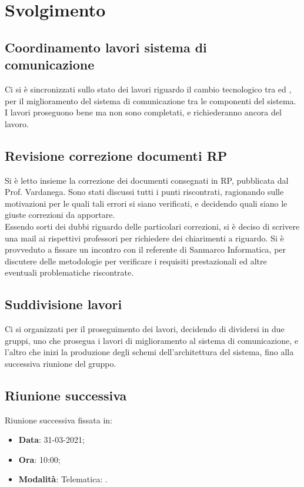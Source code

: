 \documentclass[]{article}
\begin{document}
	\newpage

	\section{Svolgimento}
		\subsection{Coordinamento lavori sistema di comunicazione}
		Ci si è sincronizzati sullo stato dei lavori riguardo il cambio tecnologico tra  ed , per il miglioramento del sistema di comunicazione tra le componenti del sistema. \\
		I lavori proseguono bene ma non sono completati, e richiederanno ancora del lavoro.
		\\
		
		\subsection{Revisione correzione documenti RP}
		Si è letto insieme la correzione dei documenti consegnati in RP, pubblicata dal Prof. Vardanega. Sono stati discussi tutti i punti riscontrati, ragionando sulle motivazioni per le quali tali errori si siano verificati, e decidendo quali siano le giuste correzioni da apportare. \\
		Essendo sorti dei dubbi riguardo delle particolari correzioni, si è deciso di scrivere una mail ai rispettivi professori per richiedere dei chiarimenti a riguardo.
		Si è provveduto a fissare un incontro con il referente di Sanmarco Informatica, per discutere delle metodologie per verificare i requisiti prestazionali ed altre eventuali problematiche riscontrate.
		\\
		
		\subsection{Suddivisione lavori}
		Ci si organizzati per il proseguimento dei lavori, decidendo di dividersi in due gruppi, uno che prosegua i lavori di miglioramento al sistema di comunicazione, e l'altro che inizi la produzione degli schemi dell'architettura del sistema, fino alla successiva riunione del gruppo.
		\\


	\subsection{Riunione successiva}
	Riunione successiva fissata in:
	\begin{itemize}
		\item \textbf{Data}: 31-03-2021;
		\item \textbf{Ora}: 10:00;
		\item \textbf{Modalità}: Telematica: .
	\end{itemize}
\end{document}
